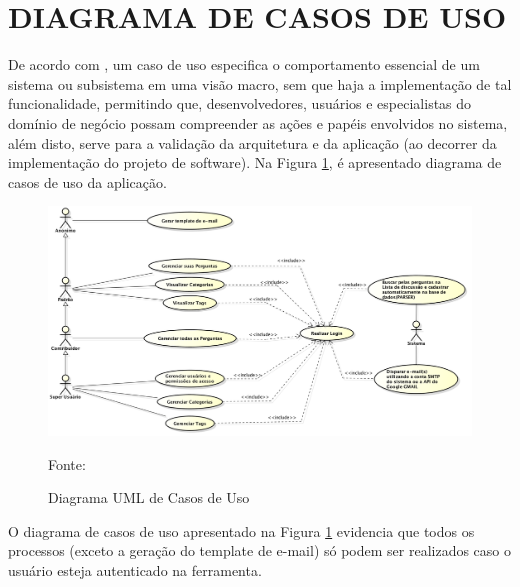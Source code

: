 \section{DIAGRAMA DE CASOS DE USO}

De acordo com , um caso de uso especifica o
comportamento essencial de um sistema ou subsistema em uma visão macro, sem que
haja a implementação de tal funcionalidade, permitindo que, desenvolvedores, 
usuários e especialistas do domínio de negócio possam compreender as ações e 
papéis envolvidos no sistema, além disto, serve para a validação da arquitetura 
e da aplicação (ao decorrer da implementação do projeto de software). Na Figura
\ref{fig:diagramaCasosDeUso}, é apresentado diagrama de casos de uso da aplicação.

\begin{figure}[h!tb]
	\caption{Diagrama UML de Casos de Uso}
	\label{fig:diagramaCasosDeUso}

	\centering
	\includegraphics[width=\textwidth]{images/usecase.png}

	\centering
	\footnotesize Fonte: \fonteOAutor
\end{figure}

\FloatBarrier 	%

O diagrama de casos de uso apresentado na Figura \ref{fig:diagramaCasosDeUso}
evidencia que todos os processos (exceto a geração do template de e-mail) só
podem ser realizados caso o usuário esteja autenticado na ferramenta.